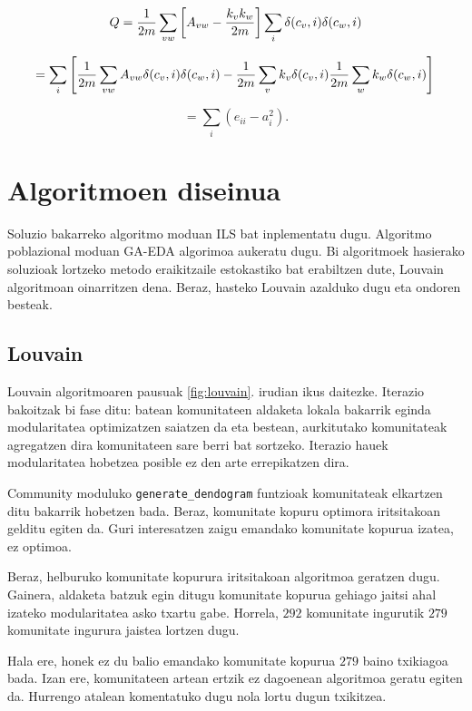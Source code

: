 \documentclass[sigconf]{acmart}
\begin{document}
$$Q=\frac{1}{2m}\sum_{vw}\left[A_{vw}-\frac{k_vk_w}{2m}\right]\sum_i\delta(c_v,i)\delta(c_w,i) \\ $$

$$=\sum_i\left[\frac{1}{2m}\sum_{vw}A_{vw}\delta(c_v,i)\delta(c_w,i) \\
-\frac{1}{2m}\sum_{v}k_{v}\delta(c_v,i)\frac{1}{2m}\sum_{w}k_{w}\delta(c_w,i)\right] \\$$

$$=\sum_{i} (e_{ii} - a_i^2).$$

\section{Algoritmoen diseinua}

Soluzio bakarreko algoritmo moduan ILS bat inplementatu dugu. Algoritmo poblazional moduan GA-EDA algorimoa aukeratu dugu. Bi algoritmoek hasierako soluzioak lortzeko metodo eraikitzaile estokastiko bat erabiltzen dute, Louvain algoritmoan oinarritzen dena. Beraz, hasteko Louvain azalduko dugu eta ondoren besteak.

\subsection{Louvain}
Louvain algoritmoaren \cite{blondel2008fast} pausuak \ref{fig:louvain}. irudian ikus daitezke. Iterazio bakoitzak bi fase ditu: batean komunitateen aldaketa lokala bakarrik eginda modularitatea optimizatzen saiatzen da eta bestean, aurkitutako komunitateak agregatzen dira komunitateen sare berri bat sortzeko. Iterazio hauek modularitatea hobetzea posible ez den arte errepikatzen dira.

Community moduluko \texttt{generate\_dendogram} funtzioak komunitateak elkartzen ditu bakarrik hobetzen bada. Beraz, komunitate kopuru optimora iritsitakoan gelditu egiten da. Guri interesatzen zaigu emandako komunitate kopurua izatea, ez optimoa. 

Beraz, helburuko komunitate kopurura iritsitakoan algoritmoa geratzen dugu. Gainera, aldaketa batzuk egin ditugu komunitate kopurua gehiago jaitsi ahal izateko modularitatea asko txartu gabe. Horrela, $292$ komunitate ingurutik $279$ komunitate ingurura jaistea lortzen dugu.

Hala ere, honek ez du balio emandako komunitate kopurua $279$ baino txikiagoa bada. Izan ere, komunitateen artean ertzik ez dagoenean algoritmoa geratu egiten da. Hurrengo atalean komentatuko dugu nola lortu dugun txikitzea.
\end{document}
